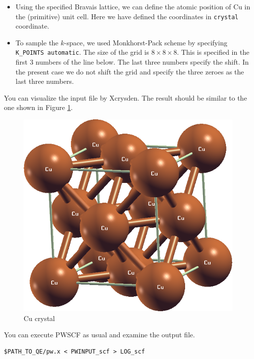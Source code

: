 \documentclass[12pt,english]{paper}
\begin{document}
\begin{itemize}
\item Using the specified Bravais lattice, we can define the atomic position
of Cu in the (primitive) unit cell. Here we have defined the coordinates
in \texttt{crystal} coordinate.
\item To sample the $k$-space, we used Monkhorst-Pack scheme by specifying
\texttt{K\_POINTS automatic}. The size of the grid is $8\times8\times8$.
This is specified in the first 3 numbers of the line below. The last
three numbers specify the shift. In the present case we do not shift
the grid and specify the three zeroes as the last three numbers.
\end{itemize}
You can visualize the input file by Xcrysden. The result should be
similar to the one shown in Figure \ref{fig:Cu-crystal}.

\begin{figure}[H]
\noindent \begin{centering}
\includegraphics[scale=0.2]{images/Cu_fcc}
\par\end{centering}

\caption{Cu crystal \label{fig:Cu-crystal}}
\end{figure}


You can execute PWSCF as usual and examine the output file.

\begin{lstlisting}
$PATH_TO_QE/pw.x < PWINPUT_scf > LOG_scf
\end{lstlisting}
\end{document}
